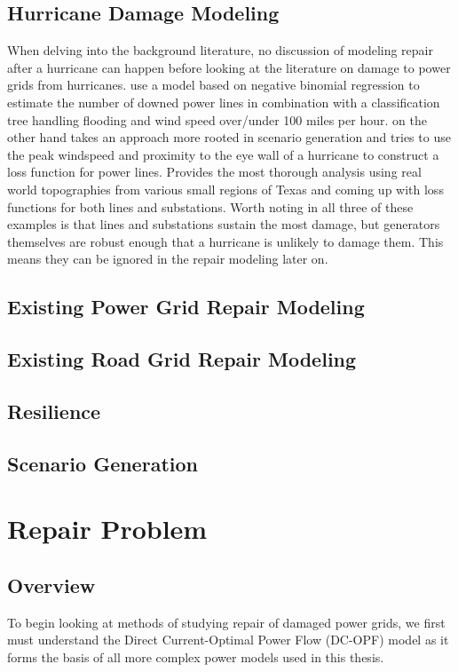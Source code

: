 \documentclass{article}
\begin{document}
	\subsection{Hurricane Damage Modeling}
		When delving into the background literature, no discussion of modeling repair after a hurricane can happen before looking at the literature on damage to power grids from hurricanes. \cite{GuikemaEA2010} use a model based on negative binomial regression to estimate the number of downed power lines in combination with a classification tree handling flooding and wind speed over/under 100 miles per hour. \cite{ScherbEA2015} on the other hand takes an approach more rooted in scenario generation and tries to use the peak windspeed and proximity to the eye wall of a hurricane to construct a loss function for power lines. \cite{WinklerEA2010} Provides the most thorough analysis using real world topographies from various small regions of Texas and coming up with loss functions for both lines and substations. Worth noting in all three of these examples is that lines and substations sustain the most damage, but generators themselves are robust enough that a hurricane is unlikely to damage them. This means they can be ignored in the repair modeling later on.
	\subsection{Existing Power Grid Repair Modeling}

	\subsection{Existing Road Grid Repair Modeling}
	
	\subsection{Resilience}
	\subsection{Scenario Generation}
	\section{Repair Problem}
	\subsection{Overview}
	To begin looking at methods of studying repair of damaged power grids, we first must understand the Direct Current-Optimal Power Flow (DC-OPF) model as it forms the basis of all more complex power models used in this thesis.
\end{document}

